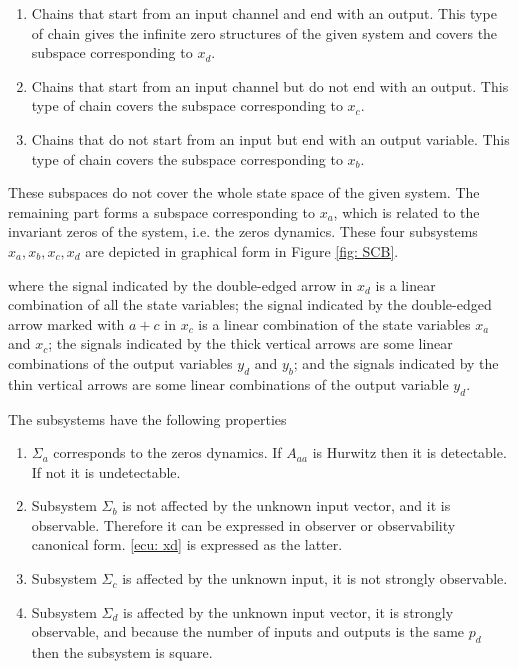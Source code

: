 \documentclass[11pt,letterpaper,twoside,openright]{report}
\begin{document}
\begin{enumerate}
	\item Chains that start from an input channel and end with an output. This type
	of chain gives the infinite zero structures of the given system and covers the
	subspace corresponding to $x_d$.
	\item Chains that start from an input channel but do not end with an output. This
	type of chain covers the subspace corresponding to $x_c$.
	\item Chains that do not start from an input but end with an output variable. This
	type of chain covers the subspace corresponding to $x_b$.
\end{enumerate}

These subspaces do not cover the whole state space of the given system. The remaining part forms a subspace corresponding to $x_a$, which is related to the invariant zeros of the system, i.e. the zeros dynamics. These four subsystems $x_a,x_b,x_c,x_d$ are depicted in graphical form in Figure \ref{fig: SCB}.



where the signal indicated by the double-edged arrow in $x_d$ is a linear combination of all the state variables; the signal indicated by the double-edged arrow marked with $a + c$ in $x_c$ is a linear combination of the state variables $x_a$ and $x_c$; the signals indicated by the thick vertical arrows are some linear combinations of the output variables $y_d$ and $y_b$; and the signals indicated by the thin vertical arrows are some linear combinations of the output variable $y_d$.

The subsystems have the following properties
\begin{enumerate}
	\item $\Sigma_a$ corresponds to the zeros dynamics. If $A_{aa}$ is Hurwitz then it is detectable. If not it is undetectable.
	\item Subsystem $\Sigma_b$ is not affected by the unknown input vector, and it is observable. Therefore it can be expressed in observer or observability canonical form. \eqref{ecu: xd} is expressed as the latter.
	\item Subsystem $\Sigma_c$ is affected by the unknown input, it is not strongly observable.
	\item Subsystem $\Sigma_d$ is affected by the unknown input vector, it is strongly observable, and because the number of inputs and outputs is the same $p_d$ then the subsystem is square.
\end{enumerate}
\end{document}
